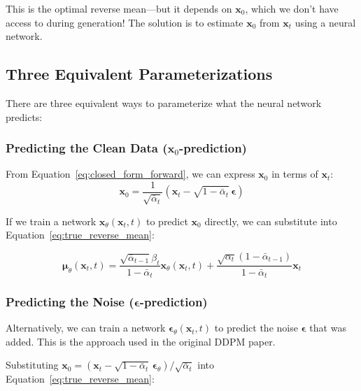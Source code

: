 This is the optimal reverse mean---but it depends on $\mathbf{x}_0$, which we don't have access to during generation! The solution is to estimate $\mathbf{x}_0$ from $\mathbf{x}_t$ using a neural network.

\subsection{Three Equivalent Parameterizations}
\label{subsec:parameterizations}

There are three equivalent ways to parameterize what the neural network predicts:

\subsubsection{Predicting the Clean Data ($\mathbf{x}_0$-prediction)}

From Equation~\ref{eq:closed_form_forward}, we can express $\mathbf{x}_0$ in terms of $\mathbf{x}_t$:
\begin{equation}
\mathbf{x}_0 = \frac{1}{\sqrt{\bar{\alpha}_t}}\left(\mathbf{x}_t - \sqrt{1-\bar{\alpha}_t}\,\boldsymbol{\epsilon}\right)
\label{eq:x0_from_xt}
\end{equation}

If we train a network $\mathbf{x}_\theta(\mathbf{x}_t, t)$ to predict $\mathbf{x}_0$ directly, we can substitute into Equation~\ref{eq:true_reverse_mean}:

\begin{equation}
\boldsymbol{\mu}_\theta(\mathbf{x}_t, t) = \frac{\sqrt{\bar{\alpha}_{t-1}}\beta_t}{1-\bar{\alpha}_t}\mathbf{x}_\theta(\mathbf{x}_t, t) + \frac{\sqrt{\alpha_t}(1-\bar{\alpha}_{t-1})}{1-\bar{\alpha}_t}\mathbf{x}_t
\label{eq:mu_x0_param}
\end{equation}

\subsubsection{Predicting the Noise ($\boldsymbol{\epsilon}$-prediction)}

Alternatively, we can train a network $\boldsymbol{\epsilon}_\theta(\mathbf{x}_t, t)$ to predict the noise $\boldsymbol{\epsilon}$ that was added. This is the approach used in the original DDPM paper.

Substituting $\mathbf{x}_0 = (\mathbf{x}_t - \sqrt{1-\bar{\alpha}_t}\,\boldsymbol{\epsilon}_\theta)/\sqrt{\bar{\alpha}_t}$ into Equation~\ref{eq:true_reverse_mean}:

